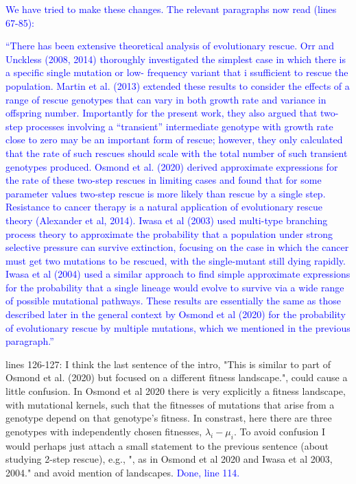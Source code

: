 \documentclass[12pt]{extarticle}
\begin{document}
\textcolor{blue}{ We have tried to make these changes. The relevant paragraphs now read (lines 67-85):}
\begin{displayquote}
	\textcolor{blue}{
    ``There has been extensive theoretical analysis of evolutionary rescue. Orr and Unckless (2008,
    2014) thoroughly investigated the simplest case in which there is a specific single mutation or low-
    frequency variant that i ssufficient to rescue the population. 
    Martin et al. (2013) extended these results
    to consider the effects of a range of rescue genotypes that can vary in both growth rate and variance in
    offspring number. 
    Importantly for the present work, they also argued that two-step processes involving
    a ``transient'' intermediate genotype with growth rate close to zero may be an important form of rescue;
    however, they only calculated that the rate of such rescues should scale with the total number of such
    transient genotypes produced. Osmond et al. (2020) derived approximate expressions for the rate of
    these two-step rescues in limiting cases and found that for some parameter values two-step rescue is
    more likely than rescue by a single step.
    \\
    Resistance to cancer therapy is a natural application of evolutionary rescue theory (Alexander et al, 2014). 
    Iwasa et al (2003) used multi-type branching process theory to approximate the probability that a population under strong selective pressure can survive extinction, focusing on the case in which the cancer must get two mutations to be rescued, with the single-mutant still dying rapidly.
    Iwasa et al (2004) used a similar approach to find simple approximate expressions for the probability that a single lineage would evolve to survive via a wide range of possible mutational pathways.
    These results are essentially the same as those described later in the general context by Osmond et al (2020) for the probability of evolutionary rescue by multiple mutations, which we mentioned in the previous paragraph.''}
\end{displayquote}



lines 126-127: I think the last sentence of the intro, "This is similar to part of Osmond et al. (2020) but focused on a different fitness landscape.", could cause a little confusion. In Osmond et al 2020 there is very explicitly a fitness landscape, with mutational kernels, such that the fitnesses of mutations that arise from a genotype depend on that genotype's fitness. In constrast, here there are three genotypes with independently chosen fitnesses, $\lambda_i - \mu_i$. To avoid confusion I would perhaps just attach a small statement to the previous sentence (about studying 2-step rescue), e.g., ", as in Osmond et al 2020 and Iwasa et al 2003, 2004." and avoid mention of landscapes.
\textcolor{blue}{Done, line 114.}
\end{document}
